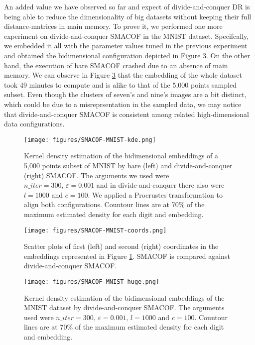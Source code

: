 An added value we have observed so far and expect of divide-and-conquer DR is being able to reduce the dimensionality of big datasets without keeping their full distance-matrices in main memory. To prove it, we performed one more experiment on divide-and-conquer SMACOF in the MNIST dataset. Specifcally, we embedded it all with the parameter values tuned in the previous experiment and obtained the bidimensional configuration depicted in Figure \ref{fig:SMACOF-MNIST-huge}. On the other hand, the execution of bare SMACOF crashed due to an absence of main memory. We can observe in Figure \ref{fig:SMACOF-MNIST-huge} that the embedding of the whole dataset took 49 minutes to compute and is alike to that of the 5,000 points sampled subset. Even though the clusters of seven's and nine's images are a bit distinct, which could be due to a misreprsentation in the sampled data, we may notice that divide-and-conquer SMACOF is consistent among related high-dimensional data configurations.

\begin{figure}[ht]
    \centering
    \texttt{[image: figures/SMACOF-MNIST-kde.png]}
    \caption{Kernel density estimation of the bidimensional embeddings of a 5,000 points subset of MNIST \citep{Cohen2017} by bare (left) and divide-and-conquer (right) SMACOF. The arguments we used were $n\_iter = 300,\, \varepsilon = 0.001$ and in divide-and-conquer there also were $l=1000$ and $c=100$. We applied a Procrustes transformation to align both configurations. Countour lines are at 70\% of the maximum estimated density for each digit and embedding.}
    \label{fig:SMACOF-MNIST-kde}
\end{figure}

\begin{figure}[ht]
    \centering
    \texttt{[image: figures/SMACOF-MNIST-coords.png]}
    \caption{Scatter plots of first (left) and second (right) coordinates in the embeddings represented in Figure \ref{fig:SMACOF-MNIST-kde}. SMACOF is compared against divide-and-conquer SMACOF.}
    \label{fig:SMACOF-MNIST-coords}
\end{figure}

\begin{figure}[ht]
    \centering
    \texttt{[image: figures/SMACOF-MNIST-huge.png]}
    \caption{Kernel density estimation of the bidimensional embeddings of the MNIST dataset \citep{Cohen2017} by divide-and-conquer SMACOF. The arguments used were $n\_iter = 300,\, \varepsilon = 0.001, \, l=1000$ and $c=100$. Countour lines are at 70\% of the maximum estimated density for each digit and embedding.}
    \label{fig:SMACOF-MNIST-huge}
\end{figure}

